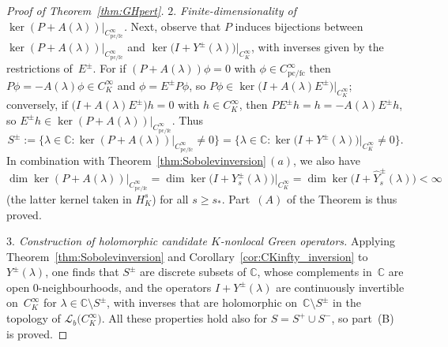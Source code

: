 \documentclass[pdftex]{sigma}
\numberwithin{equation}{section}
\newcommand{\CC}{{\mathbb C}}
\newcommand{\fc}{\mathrm{fc}}
\newcommand{\pc}{\mathrm{pc}}
\newcommand{\LL}{{\mathcal L}}
\begin{document}
\begin{proof}[Proof of Theorem~\ref{thm:GHpert}]
 	\emph{$2.$ Finite-dimensionality of $\ker (P+ A(\lambda))|_{C^\infty_{\pc/\fc}}$.} Next, observe that $P$ induces bijections between $\ker (P+ A(\lambda))|_{C^\infty_{\pc/\fc}}$ and $\ker \big(I+ Y^{\pm}(\lambda)\big)\big|_{C^\infty_K}$,
 	with inverses given by the restrictions of~$E^{\pm}$. For
 	if $(P+ A(\lambda))\phi=0$ with $\phi\in C^\infty_{\pc/\fc}$ then
 	$P\phi=- A(\lambda)\phi\in C^\infty_K$ and $\phi=E^\pm P\phi$, so $P\phi\in\ker\big(I+ A(\lambda)E^\pm\big)\big|_{C^\infty_K}$; conversely, if $\big(I+ A(\lambda)E^\pm\big)h=0$ with
 	$h\in C^\infty_K$, then $PE^\pm h = h=- A(\lambda)E^\pm h$, so
 	$E^\pm h\in \ker(P+ A(\lambda))|_{C^\infty_{\pc/\fc}}$.
 	Thus
 	\begin{equation*}
 		S^\pm:= \big\{\lambda\in \CC\colon \ker (P+ A(\lambda))|_{C^\infty_{\pc/\fc}}\neq 0\big\}= \big\{\lambda\in \CC\colon \ker \big(I+ Y^{\pm}(\lambda)\big)\big|_{C^\infty_K}\neq 0\big\}.
 	\end{equation*}
 	In combination with Theorem~\ref{thm:Sobolevinversion}\,$(a)$, we also have
 	\begin{equation}\label{eq:GHpert_remark}
 		\dim \ker (P+A(\lambda))|_{C^\infty_{\pc/\fc}} = \dim \ker \big(I+Y_s^{\pm}(\lambda)\big)\big|_{C^\infty_{K}} = \dim \ker \big(I+\hat{Y}_s^{\pm}(\lambda)\big)<\infty
 	\end{equation}
 	\big(the latter kernel taken in $H^s_K$\big) for all $s\ge s_*$. Part~$(A)$ of the Theorem is thus proved.
 	
 	\emph{$3.$ Construction of holomorphic candidate $K$-nonlocal Green operators.} Applying Theorem~\ref{thm:Sobolevinversion} and Corollary~\ref{cor:CKinfty_inversion} to $Y^\pm(\lambda)$, one finds that $S^\pm$ are discrete subsets of $\CC$, whose complements in~$\CC$ are open $0$-neighbourhoods, and the operators $I+ Y^\pm(\lambda)$ are continuously invertible on~$C^\infty_K$ for $\lambda\in\CC\setminus S^\pm$, with inverses
 	that are holomorphic on~$\CC\setminus S^\pm$ in the topology
 	of $\LL_b\big(C^\infty_K\big)$. All these properties hold also for $S=S^+\cup S^-$,
 	so part~(B) is proved.
 	

\end{proof}
\end{document}
